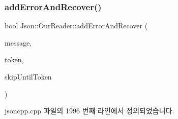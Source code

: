 \subsubsection{\texorpdfstring{add\+Error\+And\+Recover()}{addErrorAndRecover()}}
{\footnotesize\ttfamily bool Json\+::\+Our\+Reader\+::add\+Error\+And\+Recover (\begin{DoxyParamCaption}\item[{const \hyperlink{json_8h_a1e723f95759de062585bc4a8fd3fa4be}{J\+S\+O\+N\+C\+P\+P\+\_\+\+S\+T\+R\+I\+NG} \&}]{message,  }\item[{\hyperlink{class_json_1_1_our_reader_1_1_token}{Token} \&}]{token,  }\item[{\hyperlink{class_json_1_1_our_reader_a15116f7276ddf1e7a2cc3cbefa884dcc}{Token\+Type}}]{skip\+Until\+Token }\end{DoxyParamCaption})\hspace{0.3cm}{\ttfamily [private]}}



jsoncpp.\+cpp 파일의 1996 번째 라인에서 정의되었습니다.


